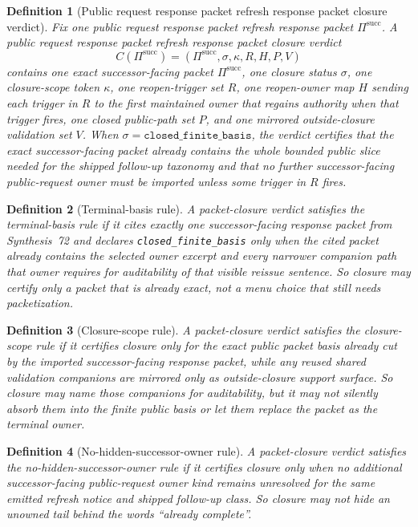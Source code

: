 \documentclass[11pt]{article}
\newtheorem{definition}{Definition}
\begin{document}
\begin{definition}[Public request response packet refresh response packet closure verdict]
Fix one public request response packet refresh response packet $\Pi^{\mathrm{succ}}$.
A \emph{public request response packet refresh response packet closure verdict}
\[
C(\Pi^{\mathrm{succ}})=(\Pi^{\mathrm{succ}},\sigma,\kappa,R,H,P,V)
\]
contains one exact successor-facing packet $\Pi^{\mathrm{succ}}$, one closure status $\sigma$, one closure-scope token $\kappa$, one reopen-trigger set $R$, one reopen-owner map $H$ sending each trigger in $R$ to the first maintained owner that regains authority when that trigger fires, one closed public-path set $P$, and one mirrored outside-closure validation set $V$.
When $\sigma=\texttt{closed\_finite\_basis}$, the verdict certifies that the exact successor-facing packet already contains the whole bounded public slice needed for the shipped follow-up taxonomy and that no further successor-facing public-request owner must be imported unless some trigger in $R$ fires.
\end{definition}

\begin{definition}[Terminal-basis rule]
A packet-closure verdict satisfies the \emph{terminal-basis rule} if it cites exactly one successor-facing response packet from Synthesis~72 and declares \texttt{closed\_finite\_basis} only when the cited packet already contains the selected owner excerpt and every narrower companion path that owner requires for auditability of that visible reissue sentence.
So closure may certify only a packet that is already exact, not a menu choice that still needs packetization.
\end{definition}

\begin{definition}[Closure-scope rule]
A packet-closure verdict satisfies the \emph{closure-scope rule} if it certifies closure only for the exact public packet basis already cut by the imported successor-facing response packet, while any reused shared validation companions are mirrored only as outside-closure support surface. So closure may name those companions for auditability, but it may not silently absorb them into the finite public basis or let them replace the packet as the terminal owner.
\end{definition}

\begin{definition}[No-hidden-successor-owner rule]
A packet-closure verdict satisfies the \emph{no-hidden-successor-owner rule} if it certifies closure only when no additional successor-facing public-request owner kind remains unresolved for the same emitted refresh notice and shipped follow-up class.
So closure may not hide an unowned tail behind the words ``already complete''.
\end{definition}
\end{document}
